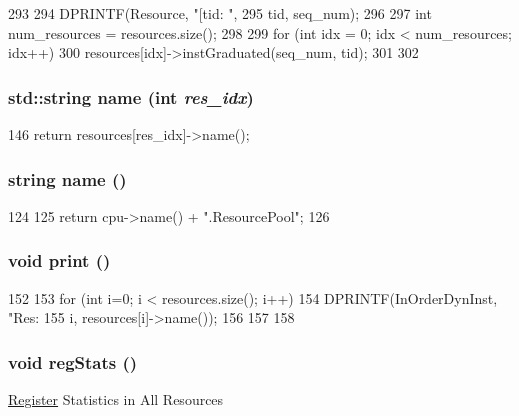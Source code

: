 \begin{DoxyCode}
293 {
294     DPRINTF(Resource, "[tid:%
      \n",
295             tid, seq_num);
296 
297     int num_resources = resources.size();
298 
299     for (int idx = 0; idx < num_resources; idx++) {
300         resources[idx]->instGraduated(seq_num, tid);
301     }
302 }
\end{DoxyCode}
\hypertarget{classResourcePool_ac28b6ddca5d1abd76095cffee93aa164}{
\subsubsection[{name}]{\setlength{\rightskip}{0pt plus 5cm}std::string name (int {\em res\_\-idx})}}
\label{classResourcePool_ac28b6ddca5d1abd76095cffee93aa164}



\begin{DoxyCode}
146 { return resources[res_idx]->name(); }
\end{DoxyCode}
\hypertarget{classResourcePool_aa62b508d2c0e7d9cec12924965276eb5}{
\subsubsection[{name}]{\setlength{\rightskip}{0pt plus 5cm}string name ()}}
\label{classResourcePool_aa62b508d2c0e7d9cec12924965276eb5}



\begin{DoxyCode}
124 {
125     return cpu->name() + ".ResourcePool";
126 }
\end{DoxyCode}
\hypertarget{classResourcePool_a388f572c62279f839ee138a9afbdeeb5}{
\subsubsection[{print}]{\setlength{\rightskip}{0pt plus 5cm}void print ()}}
\label{classResourcePool_a388f572c62279f839ee138a9afbdeeb5}



\begin{DoxyCode}
152 {
153     for (int i=0; i < resources.size(); i++) {
154         DPRINTF(InOrderDynInst, "Res:%
155                 i, resources[i]->name());
156     }
157 
158 }
\end{DoxyCode}
\hypertarget{classResourcePool_a4dc637449366fcdfc4e764cdf12d9b11}{
\subsubsection[{regStats}]{\setlength{\rightskip}{0pt plus 5cm}void regStats ()}}
\label{classResourcePool_a4dc637449366fcdfc4e764cdf12d9b11}
\hyperlink{classRegister}{Register} Statistics in All Resources 


